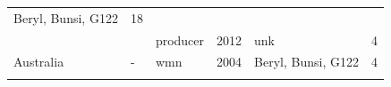 \documentclass[fleqn,10pt,lineno]{wlpeerj} %
\theoremstyle{definition}
\theoremstyle{definition}
\theoremstyle{definition}
\theoremstyle{remark}
\begin{document}
\begin{longtable}[]{@{}lllrlr@{}}
\begin{minipage}[t]{0.29\columnwidth}
Beryl, Bunsi, G122\strut
\end{minipage} & \begin{minipage}[t]{0.04\columnwidth}\raggedleft\strut
18\strut
\end{minipage}\tabularnewline
\begin{minipage}[t]{0.11\columnwidth}\raggedright\strut
\strut
\end{minipage} & \begin{minipage}[t]{0.08\columnwidth}\raggedright\strut
\strut
\end{minipage} & \begin{minipage}[t]{0.12\columnwidth}\raggedright\strut
producer\strut
\end{minipage} & \begin{minipage}[t]{0.19\columnwidth}\raggedleft\strut
2012\strut
\end{minipage} & \begin{minipage}[t]{0.29\columnwidth}\raggedright\strut
unk\strut
\end{minipage} & \begin{minipage}[t]{0.04\columnwidth}\raggedleft\strut
4\strut
\end{minipage}\tabularnewline
\begin{minipage}[t]{0.11\columnwidth}\raggedright\strut
Australia\strut
\end{minipage} & \begin{minipage}[t]{0.08\columnwidth}\raggedright\strut
-\strut
\end{minipage} & \begin{minipage}[t]{0.12\columnwidth}\raggedright\strut
wmn\strut
\end{minipage} & \begin{minipage}[t]{0.19\columnwidth}\raggedleft\strut
2004\strut
\end{minipage} & \begin{minipage}[t]{0.29\columnwidth}\raggedright\strut
Beryl, Bunsi, G122\strut
\end{minipage} & \begin{minipage}[t]{0.04\columnwidth}\raggedleft\strut
4\strut
\end{minipage}\tabularnewline
\begin{minipage}[t]{0.11\columnwidth}\raggedright\strut
\strut
\end{minipage} & \begin{minipage}[t]{0.08\columnwidth}\raggedright\strut
\strut
\end{minipage} & \begin{minipage}[t]{0.12\columnwidth}\raggedright\strut

\end{minipage}
\end{longtable}
\end{document}

